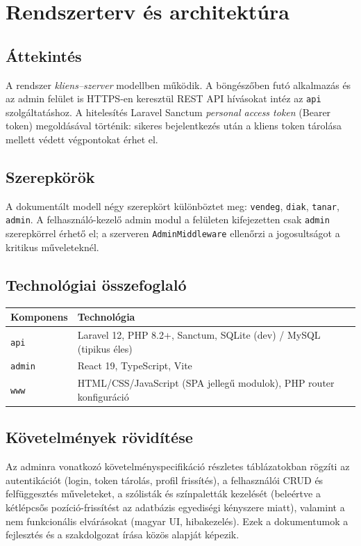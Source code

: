 \documentclass[12pt,a4paper,openany]{book}
\begin{document}
\chapter{Rendszerterv és architektúra}
\label{ch:arch}

\section{Áttekintés}
A rendszer \emph{kliens–szerver} modellben működik. A böngészőben futó alkalmazás és az admin felület is HTTPS-en keresztül REST API hívásokat intéz az \texttt{api} szolgáltatáshoz. A hitelesítés Laravel Sanctum \emph{personal access token} (Bearer token) megoldásával történik: sikeres bejelentkezés után a kliens token tárolása mellett védett végpontokat érhet el.

\section{Szerepkörök}
A dokumentált modell négy szerepkört különböztet meg: \texttt{vendeg}, \texttt{diak}, \texttt{tanar}, \texttt{admin}. A felhasználó-kezelő admin modul a felületen kifejezetten csak \texttt{admin} szerepkörrel érhető el; a szerveren \texttt{AdminMiddleware} ellenőrzi a jogosultságot a kritikus műveleteknél.

\section{Technológiai összefoglaló}
\begin{center}
\begin{tabular}{@{}ll@{}}
\toprule
\textbf{Komponens} & \textbf{Technológia} \\
\midrule
\texttt{api} & Laravel 12, PHP 8.2+, Sanctum, SQLite (dev) / MySQL (tipikus éles) \\
\texttt{admin} & React 19, TypeScript, Vite \\
\texttt{www} & HTML/CSS/JavaScript (SPA jellegű modulok), PHP router konfiguráció \\
\bottomrule
\end{tabular}
\end{center}

\section{Követelmények rövidítése}
Az adminra vonatkozó követelményspecifikáció részletes táblázatokban rögzíti az autentikációt (login, token tárolás, profil frissítés), a felhasználói CRUD és felfüggesztés műveleteket, a szólisták és színpaletták kezelését (beleértve a kétlépcsős pozíció-frissítést az adatbázis egyediségi kényszere miatt), valamint a nem funkcionális elvárásokat (magyar UI, hibakezelés). Ezek a dokumentumok a fejlesztés és a szakdolgozat írása közös alapját képezik.
\end{document}
